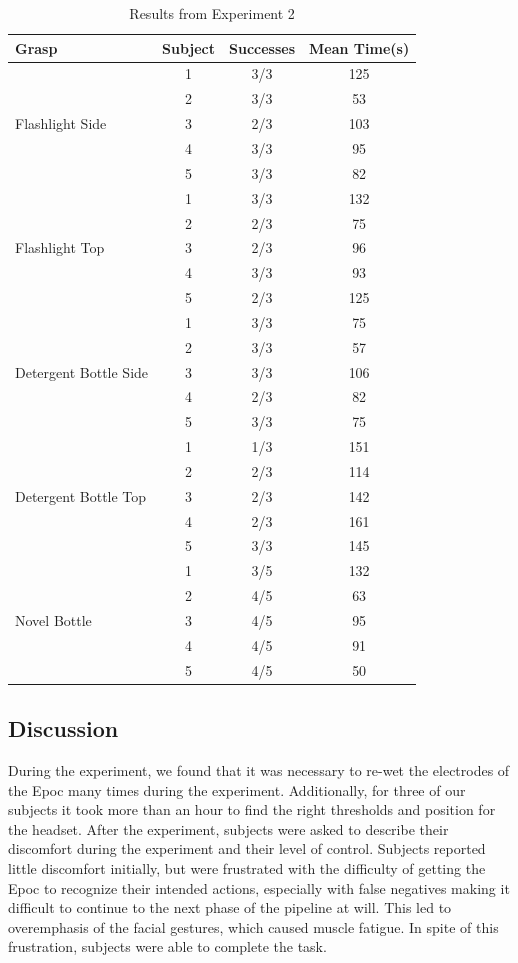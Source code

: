 \begin{table}
\centering
\begin{tabular}{ | l | c | c | c | }
\hline
Grasp & Subject & Successes & Mean Time(s) \\ \hline 
\multirow{5}{*}{Flashlight Side} & 1 & 3/3 & 125 \\ 
& 2 & 3/3 & 53 \\ 
& 3 & 2/3 & 103 \\
& 4 & 3/3 & 95 \\
& 5 & 3/3 & 82 \\ \hline
\multirow{5}{*}{Flashlight Top} & 1 & 3/3 & 132 \\ 
& 2 & 2/3 & 75 \\ 
& 3 & 2/3 & 96 \\
& 4 & 3/3 & 93 \\
& 5 & 2/3 & 125 \\ \hline
\multirow{5}{*}{\begin{minipage}{.75in}Detergent Bottle Side\end{minipage}} & 1 & 3/3 & 75 \\ 
& 2 & 3/3 & 57 \\ 
& 3 & 3/3 & 106 \\
& 4 & 2/3 & 82 \\
& 5 & 3/3 & 75 \\ \hline
\multirow{5}{*}{\begin{minipage}{.75in}Detergent Bottle Top\end{minipage}} & 1 & 1/3 & 151 \\ 
& 2 & 2/3 & 114 \\ 
& 3 & 2/3 & 142\\
& 4 & 2/3 & 161 \\
& 5 & 3/3 & 145 \\ \hline
\multirow{5}{*}{Novel Bottle} & 1 & 3/5 & 132 \\
&2 & 4/5 & 63\\
&3 & 4/5 & 95\\
&4 & 4/5 & 91\\
&5 & 4/5 & 50\\
\hline\end{tabular}
\caption{Results from Experiment 2}
\label{tab:results_2}
\end{table}

\subsection{Discussion}
During the experiment, we found that it was necessary to re-wet the electrodes of the Epoc many times during the experiment. Additionally, for three of our subjects it took more than an hour to find the right thresholds and position for the headset. After the experiment, subjects were asked to describe their discomfort during the experiment and their level of control. Subjects reported little discomfort initially, but were frustrated with the difficulty of getting the Epoc to recognize their intended actions, especially with false negatives making it difficult to continue to the next phase of the pipeline at will. This led to overemphasis of the facial gestures, which caused muscle fatigue. In spite of this frustration, subjects were able to complete the task. 

